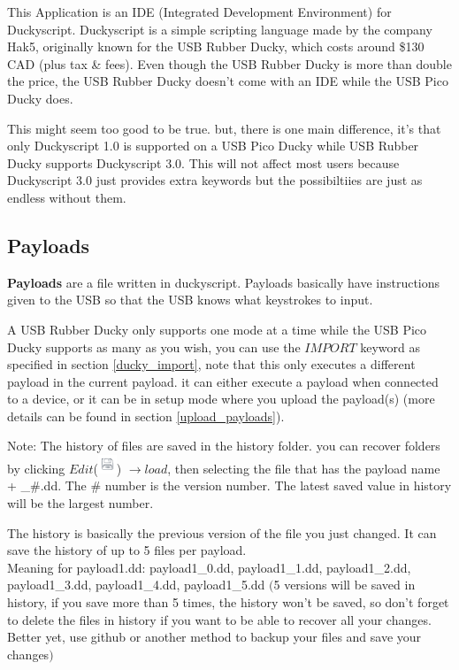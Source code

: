 \documentclass[a4paper,12pt]{article}
\begin{document}
This Application is an IDE (Integrated Development Environment) for Duckyscript. Duckyscript is a simple scripting language made by the company Hak5, originally known for the USB Rubber Ducky, which costs around \$130 CAD (plus tax \& fees).
Even though the USB Rubber Ducky is more than double the price, the USB Rubber Ducky doesn't come with an IDE while the USB Pico Ducky does.

This might seem too good to be true. but, there is one main difference,
it's that only Duckyscript 1.0 is supported on a USB Pico Ducky while USB Rubber Ducky supports Duckyscript 3.0. This will not affect most users because Duckyscript 3.0 just provides extra keywords but the possibiltiies are just as endless without them.

\subsection{Payloads}

\textbf{Payloads} are a file written in duckyscript. Payloads basically have instructions given to the USB so that the USB knows what keystrokes to input.

A USB Rubber Ducky only supports one mode at a time while the USB Pico Ducky supports as many as you wish, you can use the $IMPORT$ keyword as specified in section \ref{ducky_import}, note that this only executes a different payload in the current payload. it can either execute a payload when connected to a device, or it can be in setup mode where you upload the payload(s) (more details can be found in section \ref{upload_payloads}).

Note: The history of files are saved in the history folder. you can recover folders by clicking $Edit$(\includegraphics[width=5.5mm]{pictures/black_bk/save.png}) $ \rightarrow load$, then selecting the file that has the payload name + \_\#.dd. The \# number is the version number. The latest saved value in history will be the largest number.

The history is basically the previous version of the file you just changed. It can save the history of up to 5 files per payload.
\ \\
Meaning for payload1.dd: payload1\_0.dd, payload1\_1.dd, payload1\_2.dd, payload1\_3.dd, payload1\_4.dd, payload1\_5.dd \textbf{$\textbf{(}$}5 versions will be saved in history, if you save more than 5 times, the history won't be saved, so don't forget to delete the files in history if you want to be able to recover all your changes. Better yet, use github or another method to backup your files and save your changes$\textbf{)}$
\end{document}
